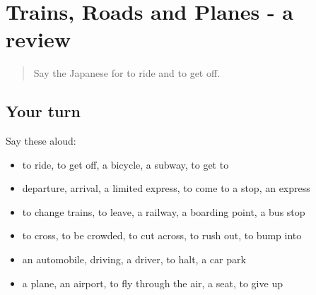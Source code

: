 \section[(dialogue)]{Trains, Roads and Planes - a review}

\label{lesson:JA-R203-review-198-203}



\begin{quote}
Say the Japanese for to ride and to get off.
\end{quote}

\subsection*{Your turn}
Say these aloud:

\begin{itemize}
\raggedright
  \item to ride, to get off, a bicycle, a subway, to get to
  \item departure, arrival, a limited express, to come to a stop, an express
  \item to change trains, to leave, a railway, a boarding point, a bus stop
  \item to cross, to be crowded, to cut across, to rush out, to bump into
  \item an automobile, driving, a driver, to halt, a car park
  \item a plane, an airport, to fly through the air, a seat, to give up
\end{itemize}

